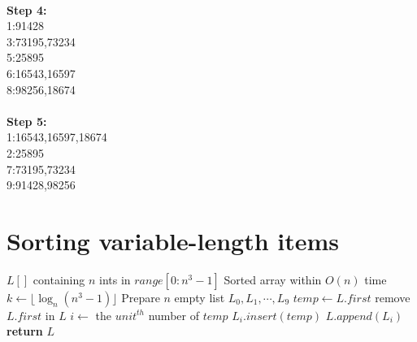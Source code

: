 \documentclass[a4paper]{article}
\begin{document}
\begin{spacing}{1.3}
\begin{multicols}{5}
\\\textbf{Step 4:} {\\1:91428\\3:73195,73234\\5:25895\\6:16543,16597\\8:98256,18674}\\
\\\textbf{Step 5:} {\\1:16543,16597,18674\\2:25895\\7:73195,73234\\9:91428,98256}\\
\end{multicols}

\section*{Sorting variable-length items}
\begin{algorithmic}[1]
\Require $L[]$ containing $n$ ints in $range[0:n^3-1]$
\Ensure Sorted array within $O(n)$ time
\State $k\gets \lfloor \log_{n}(n^3-1)\rfloor$
\State Prepare $n$ empty list $L_0,L_1,\cdots ,L_9$
\State $temp\gets L.first$
\State remove $L.first$ in $L$
\State $i\gets$ the $unit^{th}$ number of $temp$
\State $L_i.insert(temp)$
\EndWhile
{}
\State $L.append(L_i)$
\EndFor
\EndFor
\State \textbf{return} $L$
\end{algorithmic}

\end{spacing}
\end{document}
